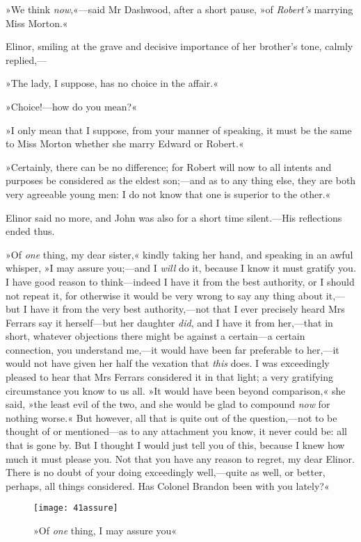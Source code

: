 »We think \textit{now},«—said Mr Dashwood, after a short pause, »of \textit{Robert’s} marrying Miss Morton.«

Elinor, smiling at the grave and decisive importance of her brother’s tone, calmly replied,—

»The lady, I suppose, has no choice in the affair.«

»Choice!—how do you mean?«

»I only mean that I suppose, from your manner of speaking, it must be the same to Miss Morton whether she marry Edward or Robert.«

»Certainly, there can be no difference; for Robert will now to all intents and purposes be considered as the eldest son;—and as to any thing else, they are both very agreeable young men: I do not know that one is superior to the other.«

Elinor said no more, and John was also for a short time silent.—His reflections ended thus.

»Of \textit{one} thing, my dear sister,« kindly taking her hand, and speaking in an awful whisper, »I may assure you;—and I \textit{will} do it, because I know it must gratify you. I have good reason to think—indeed I have it from the best authority, or I should not repeat it, for otherwise it would be very wrong to say any thing about it,—but I have it from the very best authority,—not that I ever precisely heard Mrs Ferrars say it herself—but her daughter \textit{did}, and I have it from her,—that in short, whatever objections there might be against a certain—a certain connection, you understand me,—it would have been far preferable to her,—it would not have given her half the vexation that \textit{this} does. I was exceedingly pleased to hear that Mrs Ferrars considered it in that light; a very gratifying circumstance you know to us all. »It would have been beyond comparison,« she said, »the least evil of the two, and she would be glad to compound \textit{now} for nothing worse.« But however, all that is quite out of the question,—not to be thought of or mentioned—as to any attachment you know, it never could be: all that is gone by. But I thought I would just tell you of this, because I knew how much it must please you. Not that you have any reason to regret, my dear Elinor. There is no doubt of your doing exceedingly well,—quite as well, or better, perhaps, all things considered. Has Colonel Brandon been with you lately?«

\begin{figure}[tbph]
\centering
\texttt{[image: 41assure]}
\caption{»Of \textit{one} thing, I may assure you«}
\end{figure}

